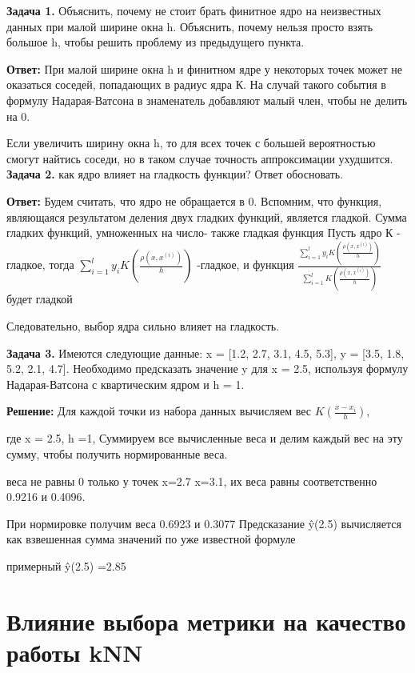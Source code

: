 \textbf{Задача 1.}
Объяснить, почему не стоит брать финитное ядро на неизвестных данных при малой ширине окна h. Объяснить, почему нельзя просто взять большое h, чтобы решить проблему из предыдущего пункта. 

\textbf{Ответ:} 
При малой ширине окна h и финитном ядре у некоторых точек может не оказаться соседей, попадающих в радиус ядра К. На случай такого события в формулу Надарая-Ватсона в знаменатель добавляют малый член, чтобы не делить на 0.

Если увеличить ширину окна h, то для всех точек с большей вероятностью смогут найтись соседи, но в таком случае точность аппроксимации ухудшится.
\\

\textbf{Задача 2.}  как ядро влияет на гладкость функции? Ответ обосновать.

\textbf{Ответ:} 
Будем считать, что ядро не обращается в 0. 
Вспомним, что функция, являющаяся результатом деления двух гладких функций, является гладкой.
Сумма гладких функций, умноженных на число- также гладкая функция 
Пусть ядро К - гладкое, тогда ${\sum\limits_{i=1}^ly_iK\left(\frac{\rho(x, x^{(i)})}{h}\right)}$ -гладкое, и функция 
$\frac{\sum\limits_{i=1}^ly_iK\left(\frac{\rho(x, x^{(i)})}{h}\right)}{\sum\limits_{i=1}^lK\left(\frac{\rho(x, x^{(i)})}{h}\right)}$ 
будет гладкой

Следовательно, выбор ядра сильно влияет на гладкость.

\textbf{Задача 3.} Имеются следующие данные: x = [1.2, 2.7, 3.1, 4.5, 5.3],  y = [3.5, 1.8, 5.2, 2.1, 4.7].  Необходимо предсказать значение y для x = 2.5, используя формулу Надарая-Ватсона с квартическим ядром и h = 1.


\textbf{Решение:} Для каждой точки из набора данных вычисляем вес $K(\frac{x-x_i}{h})$, 

где x = 2.5, h =1,
Суммируем все вычисленные веса и делим каждый вес на эту сумму, чтобы получить нормированные веса.

веса не равны 0 только у точек x=2.7 x=3.1, их веса равны соответственно 0.9216 и 0.4096. 

При нормировке получим веса 0.6923 и 0.3077
Предсказание ŷ(2.5) вычисляется как взвешенная сумма значений по уже известной формуле 

примерный ŷ(2.5) =2.85


\section{Влияние выбора метрики на качество работы kNN}

